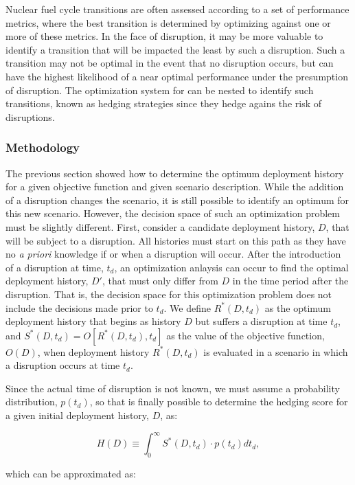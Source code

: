 Nuclear fuel cycle transitions are often assessed according to a set of
performance metrics, where the best transition is determined by optimizing
against one or more of these metrics.  In the face of disruption, it may be
more valuable to identify a transition that will be impacted the least by such
a disruption.  Such a transition may not be optimal in the event that no
disruption occurs, but can have the highest likelihood of a near optimal
performance under the presumption of disruption.  The optimization system for
\Cyclus{} can be nested to identify such transitions, known as hedging
strategies since they hedge agains the risk of disruptions.

\subsubsection{Methodology}

The previous section showed how to determine the optimum deployment history
for a given objective function and given scenario description.  While the
addition of a disruption changes the scenario, it is still possible to
identify an optimum for this new scenario.  However, the decision space of
such an optimization problem must be slightly different.  First, consider a
candidate deployment history, $D$, that will be subject to a disruption. All
histories must start on this path as they have no \textit{a priori} knowledge
if or when a disruption will occur.  After the introduction of a disruption at
time, $t_d$, an optimization anlaysis can occur to find the optimal deployment
history, $D'$, that must only differ from $D$ in the time period after the
disruption.  That is, the decision space for this optimization problem does
not include the decisions made prior to $t_d$.  We define $R^*(D,t_d)$ as the
optimum deployment history that begins as history $D$ but suffers a disruption
at time $t_d$, and $S^*(D,t_d) = O[R^*(D,t_d),t_d]$ as the value of the
objective function, $O(D)$, when deployment history $R^*(D,t_d)$ is evaluated
in a scenario in which a disruption occurs at time $t_d$.

Since the actual time of disruption is not known, we must assume a probability
distribution, $p(t_d)$, so that is finally possible to determine the hedging
score for a given initial deployment history, $D$, as:

$$H(D) \equiv \int_0^\infty S^*(D,t_d) \cdot p(t_d) dt_d,$$

\noindent which can be approximated as:

